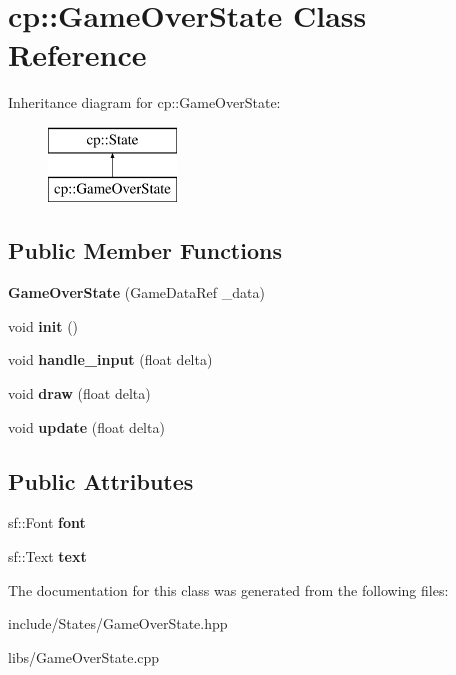 \hypertarget{classcp_1_1_game_over_state}{}\section{cp\+:\+:Game\+Over\+State Class Reference}
\label{classcp_1_1_game_over_state}
Inheritance diagram for cp\+:\+:Game\+Over\+State\+:\begin{figure}[H]
\begin{center}
\leavevmode
\includegraphics[height=2.000000cm]{classcp_1_1_game_over_state}
\end{center}
\end{figure}
\subsection*{Public Member Functions}
\begin{DoxyCompactItemize}
\item 
\mbox{\label{classcp_1_1_game_over_state_a8899ce7260ab74b44864daa533115e2c}} 
{\bfseries Game\+Over\+State} (Game\+Data\+Ref \+\_\+data)
\item 
\mbox{\label{classcp_1_1_game_over_state_a17c6bda552b241b54306dfe6845697be}} 
void {\bfseries init} ()
\item 
\mbox{\label{classcp_1_1_game_over_state_a24406ce1a3f8e697ff1444dc9f2427c9}} 
void {\bfseries handle\+\_\+input} (float delta)
\item 
\mbox{\label{classcp_1_1_game_over_state_a63de2b959443ef1f208d1d1e69e389f1}} 
void {\bfseries draw} (float delta)
\item 
\mbox{\label{classcp_1_1_game_over_state_af9154256a66528e017dfcff73289b2d6}} 
void {\bfseries update} (float delta)
\end{DoxyCompactItemize}
\subsection*{Public Attributes}
\begin{DoxyCompactItemize}
\item 
\mbox{\label{classcp_1_1_game_over_state_acdeb1263f0f41328538cd29d451df30e}} 
sf\+::\+Font {\bfseries font}
\item 
\mbox{\label{classcp_1_1_game_over_state_ae6d660908d6e67f5f0bb94ff2b096682}} 
sf\+::\+Text {\bfseries text}
\end{DoxyCompactItemize}


The documentation for this class was generated from the following files\+:\begin{DoxyCompactItemize}
\item 
include/\+States/Game\+Over\+State.\+hpp\item 
libs/Game\+Over\+State.\+cpp\end{DoxyCompactItemize}
